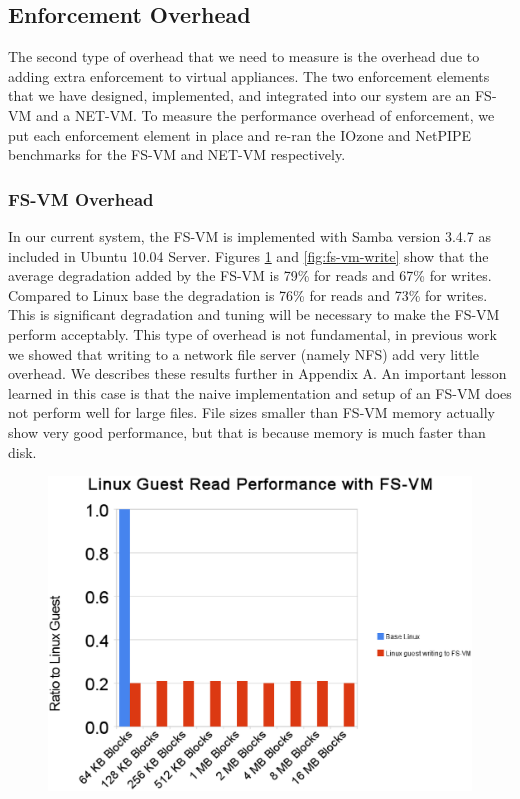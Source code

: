 \subsection{Enforcement Overhead}
\label{sec:enforce-overhead}

The second type of overhead that we need to measure is the overhead due to adding extra enforcement to virtual appliances. The two enforcement elements that we have designed, implemented, and integrated into our system are an FS-VM and a NET-VM. To measure the performance overhead of enforcement, we put each enforcement element in place and re-ran the IOzone and NetPIPE benchmarks for the FS-VM and NET-VM respectively.

\subsubsection{FS-VM Overhead}

In our current system, the FS-VM is implemented with Samba version 3.4.7 as included in Ubuntu 10.04 Server. Figures \ref{fig:fs-vm-read} and \ref{fig:fs-vm-write} show that the average degradation added by the FS-VM is 79\% for reads and 67\% for writes. Compared to Linux base the degradation is 76\% for reads and 73\% for writes. This is significant degradation and tuning will be necessary to make the FS-VM perform acceptably. This type of overhead is not fundamental, in previous work we showed that writing to a network file server (namely NFS) add very little overhead. We describes these results further in Appendix A. An important lesson learned in this case is that the naive implementation and setup of an FS-VM does not perform well for large files. File sizes smaller than FS-VM memory actually show very good performance, but that is because memory is much faster than disk. 

\begin{figure}[tbp]
\begin{centering}
\label{fig:fs-vm-read}
\includegraphics[scale=.7,angle=90]{figs/fs-vm-read}
\end{centering}
\end{figure}

